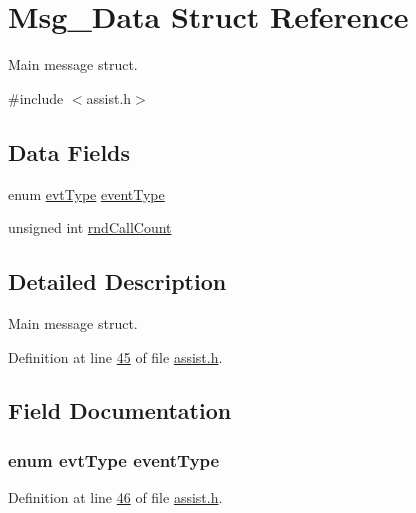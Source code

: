 \hypertarget{struct_msg___data}{}\section{Msg\+\_\+\+Data Struct Reference}
\label{struct_msg___data}


Main message struct.  




{\ttfamily \#include $<$assist.\+h$>$}

\subsection*{Data Fields}
\begin{DoxyCompactItemize}
\item 
enum \hyperlink{assist_8h_a7c1688de451e0dea1e11617bce3ec450}{evt\+Type} \hyperlink{struct_msg___data_a015b6eb45982e1842ee8fc389a099ced}{event\+Type}
\item 
unsigned int \hyperlink{struct_msg___data_ab4d75bc6367f5cfbfabc69690fdc1efc}{rnd\+Call\+Count}
\end{DoxyCompactItemize}


\subsection{Detailed Description}
Main message struct. 

Definition at line \hyperlink{assist_8h_source_l00045}{45} of file \hyperlink{assist_8h_source}{assist.\+h}.



\subsection{Field Documentation}
\hypertarget{struct_msg___data_a015b6eb45982e1842ee8fc389a099ced}{}
\subsubsection[{event\+Type}]{\setlength{\rightskip}{0pt plus 5cm}enum {\bf evt\+Type} event\+Type}\label{struct_msg___data_a015b6eb45982e1842ee8fc389a099ced}


Definition at line \hyperlink{assist_8h_source_l00046}{46} of file \hyperlink{assist_8h_source}{assist.\+h}.

\hypertarget{struct_msg___data_ab4d75bc6367f5cfbfabc69690fdc1efc}{}
